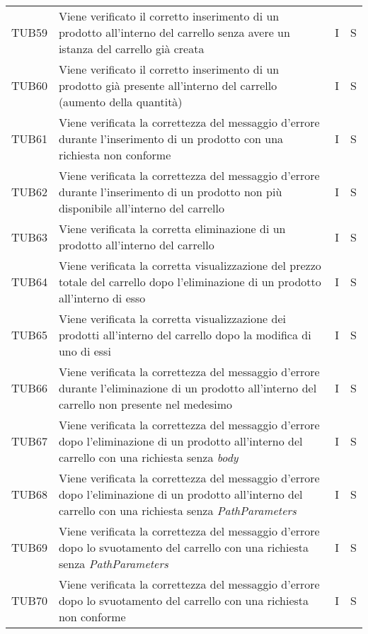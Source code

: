 {\begin{longtable}{C{2cm} C{9.6cm} C{1.5cm} C{1cm}}
TUB59 & Viene verificato il corretto inserimento di un prodotto all'interno del carrello senza avere un istanza del carrello già creata & I & S\\

TUB60 & Viene verificato il corretto inserimento di un prodotto già presente all'interno del carrello (aumento della quantità)& I & S\\

TUB61 & Viene verificata la correttezza del messaggio d'errore durante l'inserimento di un prodotto con una richiesta non conforme & I & S\\

TUB62 & Viene verificata la correttezza del messaggio d'errore durante l'inserimento di un prodotto non più disponibile all'interno del carrello & I & S\\

TUB63 & Viene verificata la corretta eliminazione di un prodotto all'interno del carrello & I & S\\

TUB64 & Viene verificata la corretta visualizzazione del prezzo totale del carrello dopo l'eliminazione di un prodotto all'interno di esso & I & S\\

TUB65 & Viene verificata la corretta visualizzazione dei prodotti all'interno del carrello dopo la modifica di uno di essi & I & S\\

TUB66 & Viene verificata la correttezza del messaggio d'errore durante l'eliminazione di un prodotto all'interno del carrello non presente nel medesimo & I & S\\

TUB67 & Viene verificata la correttezza del messaggio d'errore dopo l'eliminazione di un prodotto all'interno del carrello con una richiesta senza \textit{body} & I & S\\

TUB68 & Viene verificata la correttezza del messaggio d'errore dopo l'eliminazione di un prodotto all'interno del carrello con una richiesta senza \textit{PathParameters} & I & S\\

TUB69 & Viene verificata la correttezza del messaggio d'errore dopo lo svuotamento del carrello con una richiesta senza \textit{PathParameters} & I & S\\

TUB70 & Viene verificata la correttezza del messaggio d'errore dopo lo svuotamento del carrello con una richiesta non conforme & I & S\\


\end{longtable}}
